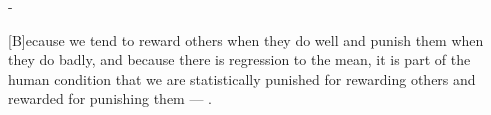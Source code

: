 \documentclass[9pt,b5paper,titlepage]{memoir}
\numberwithin{equation}{chapter}
\begin{document}
\frontmatter



\begin{titlingpage}
  \vspace*{-2cm}
  \calccentering{\unitlength}
  \begin{adjustwidth*}{\unitlength-1cm}{-\unitlength-1cm}
    \maketitle
  \end{adjustwidth*}
\end{titlingpage}


[B]ecause we tend to reward others when they do well and punish them when they do badly, and because there is regression to the mean, it is part of the human condition that we are statistically punished for rewarding others and rewarded for punishing them --- \cite{Kahneman2012}.

\cleartorecto
{}


\cleartorecto
{}


\end{document}
